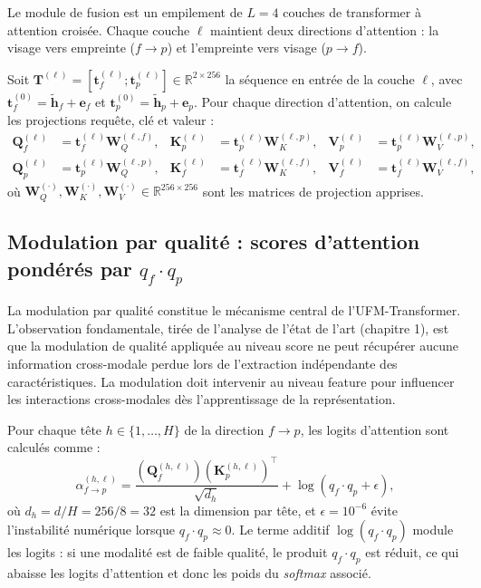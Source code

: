 \documentclass[12pt,a4paper]{report}
\begin{document}
Le module de fusion est un empilement de $L = 4$ couches de transformer \`{a} attention crois\'{e}e. Chaque couche $\ell$ maintient deux directions d'attention : la visage vers empreinte ($f \rightarrow p$) et l'empreinte vers visage ($p \rightarrow f$).

Soit $\mathbf{T}^{(\ell)} = [\mathbf{t}_f^{(\ell)} ; \mathbf{t}_p^{(\ell)}] \in \mathbb{R}^{2 \times 256}$ la s\'{e}quence en entr\'{e}e de la couche $\ell$, avec $\mathbf{t}_f^{(0)} = \tilde{\mathbf{h}}_f + \mathbf{e}_f$ et $\mathbf{t}_p^{(0)} = \tilde{\mathbf{h}}_p + \mathbf{e}_p$. Pour chaque direction d'attention, on calcule les projections requ\^{e}te, cl\'{e} et valeur :
\begin{align}
\mathbf{Q}_f^{(\ell)} &= \mathbf{t}_f^{(\ell)} \mathbf{W}_Q^{(\ell,f)}, & \mathbf{K}_p^{(\ell)} &= \mathbf{t}_p^{(\ell)} \mathbf{W}_K^{(\ell,p)}, & \mathbf{V}_p^{(\ell)} &= \mathbf{t}_p^{(\ell)} \mathbf{W}_V^{(\ell,p)}, \\
\mathbf{Q}_p^{(\ell)} &= \mathbf{t}_p^{(\ell)} \mathbf{W}_Q^{(\ell,p)}, & \mathbf{K}_f^{(\ell)} &= \mathbf{t}_f^{(\ell)} \mathbf{W}_K^{(\ell,f)}, & \mathbf{V}_f^{(\ell)} &= \mathbf{t}_f^{(\ell)} \mathbf{W}_V^{(\ell,f)},
\end{align}
o\`{u} $\mathbf{W}_Q^{(\cdot)}, \mathbf{W}_K^{(\cdot)}, \mathbf{W}_V^{(\cdot)} \in \mathbb{R}^{256 \times 256}$ sont les matrices de projection apprises.

\subsection{Modulation par qualit\'{e} : scores d'attention pond\'{e}r\'{e}s par $q_f \cdot q_p$}

La modulation par qualit\'{e} constitue le m\'{e}canisme central de l'UFM-Transformer. L'observation fondamentale, tir\'{e}e de l'analyse de l'\'{e}tat de l'art (chapitre 1), est que la modulation de qualit\'{e} appliqu\'{e}e au niveau score ne peut r\'{e}cup\'{e}rer aucune information cross-modale perdue lors de l'extraction ind\'{e}pendante des caract\'{e}ristiques. La modulation doit intervenir au niveau feature pour influencer les interactions cross-modales d\`{e}s l'apprentissage de la repr\'{e}sentation.

Pour chaque t\^{e}te $h \in \{1, \ldots, H\}$ de la direction $f \rightarrow p$, les logits d'attention sont calcul\'{e}s comme :
\begin{equation}
\label{eq:attention-logits}
\alpha_{f \rightarrow p}^{(h,\ell)} = \frac{(\mathbf{Q}_f^{(h,\ell)})(\mathbf{K}_p^{(h,\ell)})^\top}{\sqrt{d_h}} + \log(q_f \cdot q_p + \epsilon),
\end{equation}
o\`{u} $d_h = d / H = 256 / 8 = 32$ est la dimension par t\^{e}te, et $\epsilon = 10^{-6}$ \'{e}vite l'instabilit\'{e} num\'{e}rique lorsque $q_f \cdot q_p \approx 0$. Le terme additif $\log(q_f \cdot q_p)$ module les logits : si une modalit\'{e} est de faible qualit\'{e}, le produit $q_f \cdot q_p$ est r\'{e}duit, ce qui abaisse les logits d'attention et donc les poids du \emph{softmax} associ\'{e}.
\end{document}
